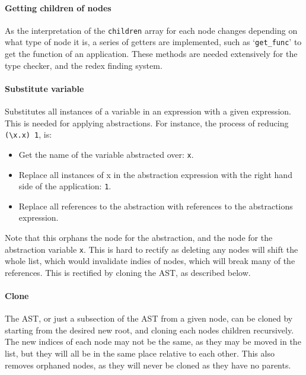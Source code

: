 \paragraph{Getting children of nodes} As the interpretation of the \verb|children| array for each node changes depending on what type of node it is, a series of getters are implemented, such as `\verb|get_func|' to get the function of an application. These methods are needed extensively for the type checker, and the redex finding system. 

\paragraph{Substitute variable} Substitutes all instances of a variable in an expression with a given expression. This is needed for applying abstractions. For instance, the process of reducing \verb|(\x.x) 1|, is:
\begin{itemize}
    \item Get the name of the variable abstracted over: \verb|x|.
    \item Replace all instances of x in the abstraction expression with the right hand side of the application: \verb|1|.
    \item Replace all references to the abstraction with references to the abstractions expression. 
\end{itemize}

Note that this orphans the node for the abstraction, and the node for the abstraction variable \verb|x|. This is hard to rectify as deleting any nodes will shift the whole list, which would invalidate indies of nodes, which will break many of the references. This is rectified by cloning the AST, as described below.

\paragraph{Clone} The AST, or just a subsection of the \ac{AST} from a given node, can be cloned by starting from the desired new root, and cloning each nodes children recursively. The new indices of each node may not be the same, as they may be moved in the list, but they will all be in the same place relative to each other. This also removes orphaned nodes, as they will never be cloned as they have no parents. 


